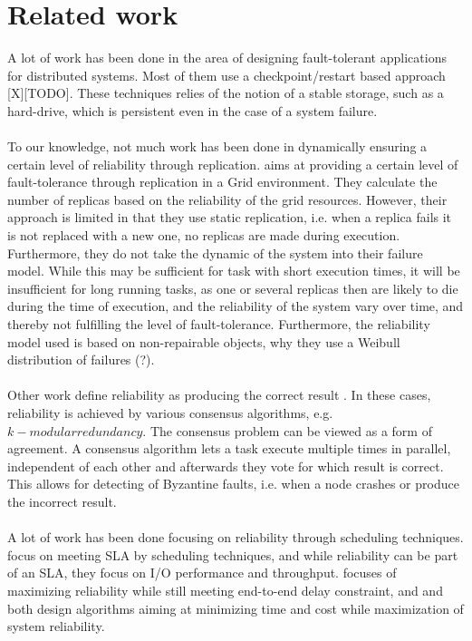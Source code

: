 \documentclass{cslthse-msc}
\begin{document}
\section{Related work} \label{sec:related_work}
A lot of work has been done in the area of designing fault-tolerant applications for distributed systems. Most of them use a checkpoint/restart based approach [X][TODO]. These techniques relies of the notion of a stable storage, such as a hard-drive, which is persistent even in the case of a system failure.
\\\\
To our knowledge, not much work has been done in dynamically ensuring a certain level of reliability through replication.\cite{effTaskReplMobGrid} aims at providing a certain level of fault-tolerance through replication in a Grid environment. They calculate the number of replicas based on the reliability of the grid resources. However, their approach is limited in that they use static replication, i.e. when a replica fails it is not replaced with a new one, no replicas are made during execution. Furthermore, they do not take the dynamic of the system into their failure model. While this may be sufficient for task with short execution times, it will be insufficient for long running tasks, as one or several replicas then are likely to die during the time of execution, and the reliability of the system vary over time, and thereby not fulfilling the level of fault-tolerance. Furthermore, the reliability model used is based on non-repairable objects, why they use a Weibull distribution of failures (?).
\\\\
Other work define reliability as producing the correct result \cite{selfAdaptRel} \cite{imprRelAdaptRL} \cite{X}. In these cases, reliability is achieved by various consensus algorithms, e.g. $k-modular redundancy$. The consensus problem can be viewed as a form of agreement. A consensus algorithm lets a task execute multiple times in parallel, independent of each other and afterwards they vote for which result is correct. This allows for detecting of Byzantine faults, i.e. when a node crashes or produce the incorrect result.
\\\\
A lot of work has been done focusing on reliability through scheduling techniques. \cite{SLASched} focus on meeting SLA by scheduling techniques, and while reliability can be part of an SLA, they focus on I/O performance and throughput. \cite{algoMaxRelEndToEndConstraint} focuses of maximizing reliability while still meeting end-to-end delay constraint, and \cite{algoMinExTime} and \cite{algoOptTimeMaxRel} both design algorithms aiming at minimizing time and cost while maximization of system reliability.
\end{document}
